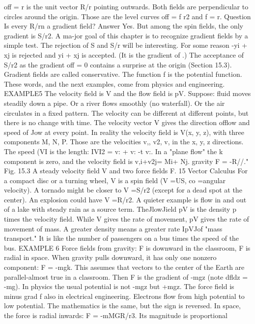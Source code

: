 off = r is the unit vector R/r pointing outwards. Both fields are perpendicular to
circles around the origin. Those are the level curves off = f r2 and f = r.
Question Is every R/rn a gradient field?
Answer Yes. But among the spin fields, the only gradient is S/r2.
A ma-jor goal of this chapter is to recognize gradient fields by a simple test. The
rejection of S and S/r will be interesting. For some reason -yi + xj is rejected and
yi + xj is accepted. (It is the gradient of .) The acceptance of S/r2 as the
gradient off = 0 contains a surprise at the origin (Section 15.3).
Gradient fields are called conservative. The function f is the potential function.
These words, and the next examples, come from physics and engineering.
EXAMPLE5 The velocity field is V and the flow field is pV.
Suppose: fluid moves steadily down a pipe. Or a river flows smoothly (no waterfall).
Or the air circulates in a fixed pattern. The velocity can be different at different points,
but there is no change with time. The velocity vector V gives the direction offlow
and speed of Jow at every point.
In reality the velocity field is V(x, y, z), with three components M, N, P. Those are
the velocities v,, v2, v, in the x, y, z directions. The speed (VI is the length: IVI2 =
v: + v: -t v:. In a "plane flow" the k component is zero, and the velocity field is
v,i+v2j= Mi+ Nj.
gravity
F = -R//."
Fig. 15.3 A steady velocity field V and two force fields F. 
15 Vector Calculus
For a compact disc or a turning wheel, V is a spin field (V =US, co =angular
velocity). A tornado might be closer to V =S/r2 (except for a dead spot at the center).
An explosion could have V =R/r2. A quieter example is flow in and out of a lake
with steady rain as a source term.
TheJlowJield pV is the density p times the velocity field. While V gives the rate of
movement, pV gives the rate of movement of mass. A greater density means a greater
rate IpVJof "mass transport." It is like the number of passengers on a bus times the
speed of the bus.
EXAMPLE 6 Force fields from gravity: F is downward in the classroom, F is radial
in space.
When gravity pulls downward, it has only one nonzero component: F = -mgk. This
assumes that vectors to the center of the Earth are parallel-almost true in a classroom.
Then F is the gradient of -mgz (note dfldz = -mg).
In physics the usual potential is not -mgz but +mgz. The force field is minus grad f
also in electrical engineering. Electrons flow from high potential to low potential.
The mathematics is the same, but the sign is reversed.
In space, the force is radial inwards: F = -mMGR/r3. Its magnitude is proportional
